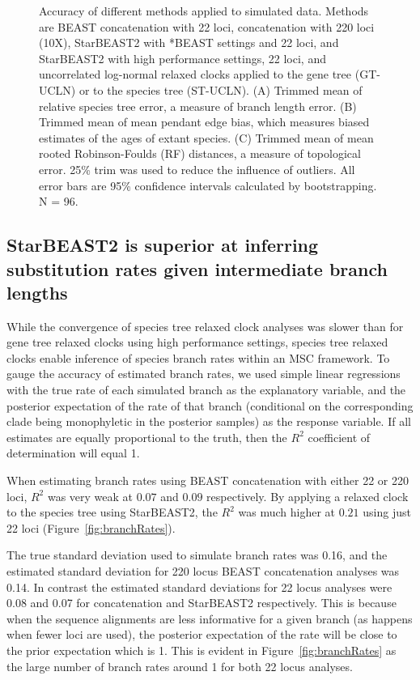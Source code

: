 \documentclass[nogrid]{MBE}%
\begin{document}
\begin{figure}[htb!]
\caption
{Accuracy of different methods applied to simulated data. Methods are BEAST concatenation with 22 loci, concatenation with 220 loci
(10X), StarBEAST2 with *BEAST settings and 22 loci, and StarBEAST2 with
high performance settings, 22 loci, and uncorrelated log-normal relaxed clocks applied
to the gene tree (GT-UCLN) or to the species tree (ST-UCLN). (A) Trimmed mean of
relative species tree error, a measure of branch length error. (B) Trimmed
mean of mean pendant edge bias, which measures biased estimates of the ages of
extant species. (C) Trimmed mean of mean rooted Robinson-Foulds (RF) distances, a
measure of topological error. 25\% trim was used to reduce the
influence of outliers. All error bars are 95\% confidence intervals calculated
by bootstrapping. N = 96.}
\label{fig:speciesTreeError}
\end{figure}

\subsection{StarBEAST2 is superior at inferring substitution rates given intermediate branch lengths}

While the convergence of species tree relaxed clock analyses was slower than for
gene tree relaxed clocks using high performance settings, species tree
relaxed clocks enable inference of species branch rates within an MSC framework.
To gauge the accuracy of estimated branch rates, we used simple linear
regressions with the true rate of each simulated branch as the explanatory
variable, and the posterior expectation of the rate of that branch (conditional
on the corresponding clade being monophyletic in the posterior samples) as the
response variable. If all estimates are equally proportional to the truth, then the $R^2$ coefficient
of determination will equal 1.

When estimating branch rates using BEAST concatenation with either 22 or 220 loci,
$R^2$ was very weak at $0.07$ and $0.09$ respectively. By applying a relaxed
clock to the species tree using StarBEAST2, the $R^2$ was much higher at $0.21$
using just 22 loci (Figure~\ref{fig:branchRates}).

The true standard deviation used to simulate branch rates was 0.16, and the
estimated standard
deviation for 220 locus BEAST concatenation analyses was 0.14. In contrast the
estimated standard deviations for 22 locus analyses were 0.08 and 0.07 for
concatenation and StarBEAST2 respectively. This is because when the sequence
alignments are less informative for a given branch (as happens when fewer loci are
used), the posterior expectation of the rate will be close to the prior
expectation which is 1. This is evident in Figure~\ref{fig:branchRates} as the
large number of branch rates around 1 for both 22 locus analyses.
\end{document}
